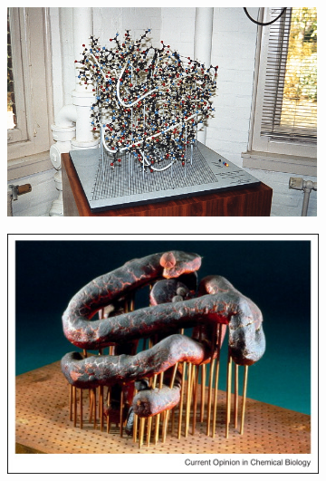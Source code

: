 \begin{figure}
  \begin{subfigure}{.5\textwidth}
  \centering
  {\includegraphics[width=0.9\linewidth]{./figures/ch1/kendrew_myoglobin_ball_and_spokes}}
  \caption{}
    \label{Fig:kendrew_ball_and_spokes}
  \end{subfigure}%
  \begin{subfigure}{.5\textwidth}
  \centering
  {\includegraphics[width=0.9\linewidth]{./figures/ch1/kendrew_myoglobin_plasticine}}
  \caption{}
  \label{Fig:kendrew_plasticine}
  \end{subfigure}%
  \\[\baselineskip]
  \begin{subfigure}{.5\textwidth}
  \centering

\end{subfigure}
\end{figure}
